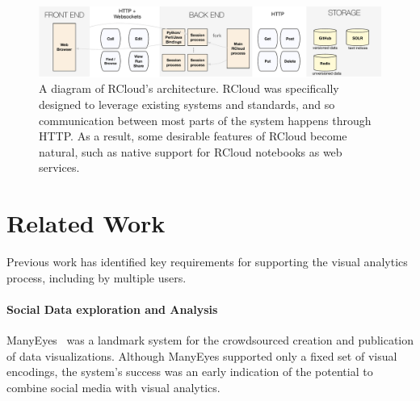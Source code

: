 \begin{figure}
  \centering
\includegraphics[width=.8\linewidth]{fig/system/system.pdf}
  \vspace{-1em}
\caption{\small \label{fig:system}A diagram of RCloud's architecture. RCloud was specifically designed to leverage existing systems and standards, and so communication between most parts of the system happens through HTTP. As a result, some desirable features of RCloud become natural, such as native support for RCloud notebooks as web services. } \vspace{-1.5em}
\end{figure}

\section{Related Work\label{sec:related}}

Previous work has identified key requirements for supporting the
visual analytics process, including by multiple users.

\paragraph*{Social Data exploration and Analysis}
ManyEyes~\cite{Viegas:2007:MAS} was a landmark system for the
crowdsourced creation and publication of data visualizations.
Although ManyEyes supported only a fixed set of visual encodings,
the system's success was an early indication of the potential to
combine social media with visual analytics.

